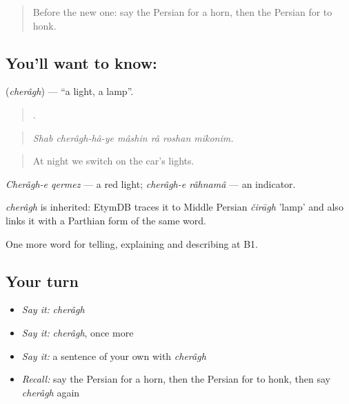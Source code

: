 \label{lesson:FA-C421-cheragh}



\begin{quote}
Before the new one: say the Persian for a horn, then the Persian for to honk.
\end{quote}

\subsection*{You'll want to know: }
\textbf{} (\emph{cherâgh}) — \textquotedblleft{}a light, a lamp\textquotedblright{}.

\begin{quote}
     .
\end{quote}

\begin{quote}
\emph{Shab cherâgh-hâ-ye mâshin râ roshan mikonim.}
\end{quote}

\begin{quote}
At night we switch on the car's lights.
\end{quote}

\emph{Cherâgh-e qermez} — a red light; \emph{cherâgh-e râhnamâ} — an indicator.

\begin{cousinweb}
\emph{cherâgh} is inherited: EtymDB traces it to Middle Persian \emph{čirāgh} 'lamp' and also links it with a Parthian form of the same word.
\end{cousinweb}

\begin{grammarlens}[title={What you've built}]
One more word for telling, explaining and describing at B1.
\end{grammarlens}

\subsection*{Your turn}
\begin{itemize}
\raggedright
  \item \emph{Say it:} \emph{cherâgh}
  \item \emph{Say it:} \emph{cherâgh}, once more
  \item \emph{Say it:} a sentence of your own with \emph{cherâgh}
  \item \emph{Recall:} say the Persian for a horn, then the Persian for to honk, then say \emph{cherâgh} again
\end{itemize}

